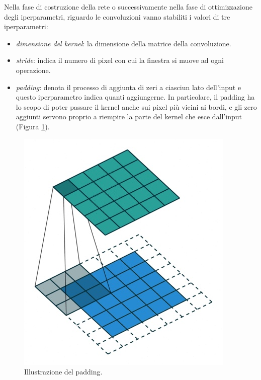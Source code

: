 Nella fase di costruzione della rete o successivamente nella fase di ottimizzazione degli iperparametri, riguardo le convoluzioni vanno stabiliti i valori di tre iperparametri:
\begin{itemize}
    \item \textit{dimensione del kernel}: la dimensione della matrice della convoluzione.
    
    \item \textit{stride}: indica il numero di pixel con cui la finestra si muove ad ogni operazione.
    
    \item \textit{padding}: denota il processo di aggiunta di zeri a ciasciun lato dell'input e questo iperparametro indica quanti aggiungerne. In particolare, il padding ha lo scopo di poter passare il kernel anche sui pixel più vicini ai bordi, e gli zero aggiunti servono proprio a riempire la parte del kernel che esce dall'input (Figura \ref{fig:padding}).
\end{itemize}

\begin{figure}[h!]
  \hspace*{1.7in}
  \includegraphics[scale=0.4]{img/padding2.jpg}
  \caption{Illustrazione del padding.}
  \label{fig:padding}
\end{figure}

